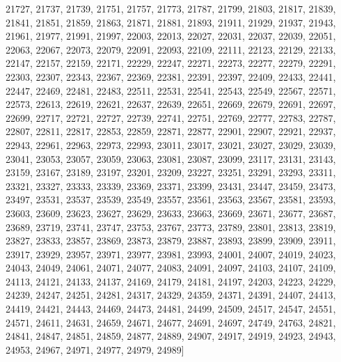 \documentclass[10pt,twocolumn]{article}
\begin{document}
\begin{thebibliography}{9}
21727, 21737, 21739, 21751, 21757, 21773, 21787, 21799, 21803, 21817, 21839, 21841, 21851, 21859, 21863, 21871, 21881, 21893, 21911, 21929, 21937, 21943, 21961, 21977, 21991, 21997, 22003, 22013, 22027, 22031, 22037, 22039, 22051, 22063, 22067, 22073, 22079, 22091, 22093, 22109, 22111, 22123, 22129, 22133, 22147, 22157, 22159, 22171, 22229, 22247, 22271, 22273, 22277, 22279, 22291, 22303, 22307, 22343, 22367, 22369, 22381, 22391, 22397, 22409, 22433, 22441, 22447, 22469, 22481, 22483, 22511, 22531, 22541, 22543, 22549, 22567, 22571, 22573, 22613, 22619, 22621, 22637, 22639, 22651, 22669, 22679, 22691, 22697, 22699, 22717, 22721, 22727, 22739, 22741, 22751, 22769, 22777, 22783, 22787, 22807, 22811, 22817, 22853, 22859, 22871, 22877, 22901, 22907, 22921, 22937, 22943, 22961, 22963, 22973, 22993, 23011, 23017, 23021, 23027, 23029, 23039, 23041, 23053, 23057, 23059, 23063, 23081, 23087, 23099, 23117, 23131, 23143, 23159, 23167, 23189, 23197, 23201, 23209, 23227, 23251, 23291, 23293, 23311, 23321, 23327, 23333, 23339, 23369, 23371, 23399, 23431, 23447, 23459, 23473, 23497, 23531, 23537, 23539, 23549, 23557, 23561, 23563, 23567, 23581, 23593, 23603, 23609, 23623, 23627, 23629, 23633, 23663, 23669, 23671, 23677, 23687, 23689, 23719, 23741, 23747, 23753, 23767, 23773, 23789, 23801, 23813, 23819, 23827, 23833, 23857, 23869, 23873, 23879, 23887, 23893, 23899, 23909, 23911, 23917, 23929, 23957, 23971, 23977, 23981, 23993, 24001, 24007, 24019, 24023, 24043, 24049, 24061, 24071, 24077, 24083, 24091, 24097, 24103, 24107, 24109, 24113, 24121, 24133, 24137, 24169, 24179, 24181, 24197, 24203, 24223, 24229, 24239, 24247, 24251, 24281, 24317, 24329, 24359, 24371, 24391, 24407, 24413, 24419, 24421, 24443, 24469, 24473, 24481, 24499, 24509, 24517, 24547, 24551, 24571, 24611, 24631, 24659, 24671, 24677, 24691, 24697, 24749, 24763, 24821, 24841, 24847, 24851, 24859, 24877, 24889, 24907, 24917, 24919, 24923, 24943, 24953, 24967, 24971, 24977, 24979, 24989]

\end{thebibliography}
\end{document}
